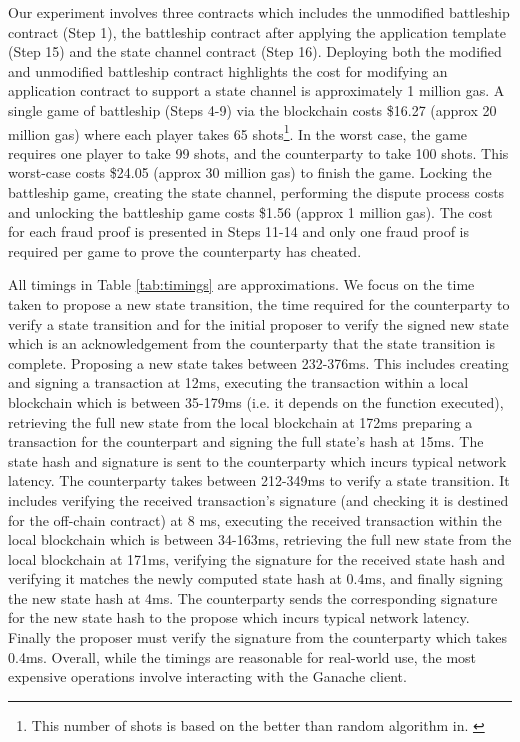 \documentclass{llncs}
\begin{document}
	Our experiment involves three contracts which includes the unmodified battleship contract (Step 1), the battleship contract after applying the application template (Step 15) and the state channel contract (Step 16). 
	Deploying both the modified and unmodified battleship contract highlights the cost for modifying an application contract to support a state channel is approximately 1 million gas. 
	A single game of battleship (Steps 4-9) via the blockchain costs \$16.27 (approx 20 million gas) where each player takes 65 shots\footnote{This number of shots is based on the better than random algorithm in. \cite{battleshipdata}}.
	In the worst case, the game requires one player to take 99 shots, and the counterparty to take 100 shots. 
	This worst-case costs \$24.05 (approx 30 million gas) to finish the game.  
	Locking the battleship game, creating the state channel, performing the dispute process costs and unlocking the battleship game costs \$1.56 (approx 1 million gas). 
	The cost for each fraud proof is presented in Steps 11-14 and only one fraud proof is required per game to prove the counterparty has cheated.
    
    All timings in Table \ref{tab:timings} are approximations. We focus on the time taken to propose a new state transition, the time required for the counterparty to verify a state transition and for the initial proposer to verify the signed new state which is an acknowledgement from the counterparty that the state transition is complete.
    Proposing a new state takes between 232-376ms. 
    This includes creating and signing a transaction at 12ms, executing the transaction within a local blockchain which is between 35-179ms (i.e. it depends on the function executed), retrieving the full new state from the local blockchain at 172ms preparing a transaction for the counterpart and signing the full state’s hash at 15ms. 
    The state hash and signature is sent to the counterparty which incurs typical network latency. 
    The counterparty takes between 212-349ms to verify a state transition. 
    It includes verifying the received transaction’s signature (and checking it is destined for the off-chain contract) at 8 ms, executing the received transaction within the local blockchain which is between 34-163ms, retrieving the full new state from the local blockchain at 171ms, verifying the signature for the received state hash and verifying it matches the newly computed state hash at 0.4ms, and finally signing the new state hash at 4ms. 
    The counterparty sends the corresponding signature for the new state hash to the propose which incurs typical network latency. 
    Finally the proposer must verify the signature from the counterparty which takes 0.4ms.
    Overall, while the timings are reasonable for real-world use, the most expensive operations involve interacting with the Ganache client.
\end{document}
